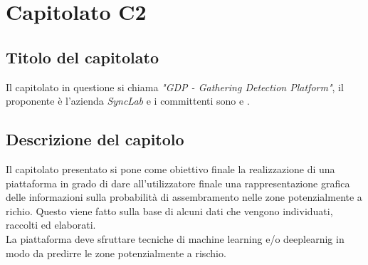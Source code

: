\section{Capitolato C2}
\subsection{Titolo del capitolato}
Il capitolato in questione si chiama \textit{"GDP - Gathering Detection Platform"}, il proponente \`e l'azienda \textit{SyncLab} e i committenti sono \VT{} e \CR{}.

\subsection{Descrizione del capitolo}
Il capitolato presentato si pone come obiettivo finale la realizzazione di una piattaforma in grado di dare all'utilizzatore finale una rappresentazione grafica delle informazioni sulla probabilità di assembramento nelle zone potenzialmente a richio. Questo viene fatto sulla base di alcuni dati che vengono individuati, raccolti ed elaborati. \\
La piattaforma deve sfruttare tecniche di machine learning e/o deeplearnig in modo da predirre le zone potenzialmente a rischio.


